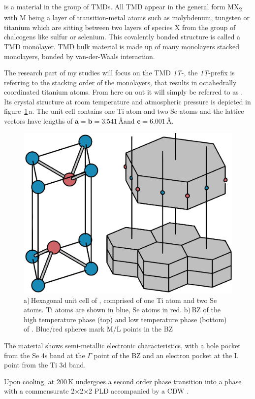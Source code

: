 \ts\space is a material in the group of \acp{TMD}.
All \ac{TMD} appear in the general form MX\textsubscript{2} with M being a layer of transition-metal atoms such as molybdenum, tungsten or titanium which are sitting between two layers of species X from the group of chalcogens like sulfur or selenium.
This covalently bonded structure is called a \ac{TMD} monolayer.
\Ac{TMD} bulk material is made up of many monolayers stacked monolayers, bonded by van-der-Waals interaction.

The research part of my studies will focus on the \ac{TMD} \textit{1T}-\ts, the \textit{1T}-prefix is referring to the stacking order of the monolayers, that results in octahedrally coordinated titanium atoms.
From here on out it will simply be referred to as \ts.
Its crystal structure at room temperature and atmospheric pressure is depicted in figure~\ref{fig:crystal}\,a.
The unit cell contains one Ti atom and two Se atoms and the lattice vectors have lengths of $\mathbf{a}=\mathbf{b}=3.541$\,\AA\space and $\mathbf{c}=6.001$\,\AA\cite{patel1983}.

\begin{figure}[!t]
	\begin{minipage}{0.5\columnwidth}
		\includegraphics[width=\columnwidth]{figs/tise2_crystal.png}
	\end{minipage}
	\hspace{0.04\columnwidth}
	\begin{minipage}{0.45\columnwidth}
		\caption{a)\,Hexagonal unit cell of \ts, comprised of one Ti atom and two Se atoms. Ti atoms are shown in blue, Se atoms in red. b)\,\ac{BZ} of the high temperature phase (top) and low temperature phase (bottom) of \ts. Blue/red spheres mark M/L points in the \ac{BZ}}
		\label{fig:crystal}
	\end{minipage}
\end{figure}

The material shows semi-metallic electronic characteristics\cite{bachrach1976}, with a hole pocket from the Se 4s band at the $\Gamma$ point of the \ac{BZ} and an electron pocket at the L point from the Ti 3d band\cite{zunger1978}.

Upon cooling, at 200\,K \cite{disalvo1976} \ts\space undergoes a second order phase transition into a phase with a commensurate 2$\times$2$\times$2 \ac{PLD} accompanied by a \ac{CDW} \cite{}.